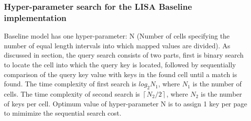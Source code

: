 \subsubsection {Hyper-parameter search for the LISA Baseline implementation}
Baseline model has one hyper-parameter: N (Number of cells specifying the number of equal length intervals into which mapped values are divided). As discussed in section, the query search consists of two parts, first is binary search to locate the cell into which the query key is located, followed by sequentially comparison of the query key value with keys in the found cell until a match is found. The time complexity of first search is $log_{2}N_{1}$, where $N_{1}$ is the number of cells. The time complexity of second search is  $ \left \lceil {N_{2} / 2}\right \rceil $, where $N_{2}$ is the number of keys per cell. Optimum value of hyper-parameter N is to assign 1 key per page to mimimize the sequential search cost. 

